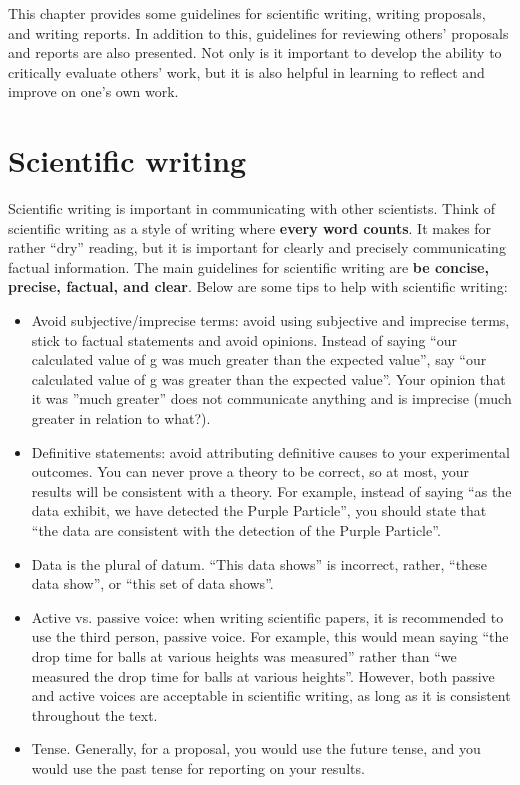 This chapter provides some guidelines for scientific writing, writing proposals, and writing reports. In addition to this, guidelines for reviewing others' proposals and reports are also presented. Not only is it important to develop the ability to critically evaluate others' work, but it is also helpful in learning to reflect and improve on one's own work.

 \vspace{0.25cm}
\section{Scientific writing}
Scientific writing is important in communicating with other scientists. Think of scientific writing as a style of writing where \textbf{every word counts}. It makes for rather ``dry'' reading, but it is important for clearly and precisely communicating factual information. The main guidelines for scientific writing are \textbf{be concise, precise, factual, and clear}. Below are some tips to help with scientific writing:
\begin{itemize}
\item Avoid subjective/imprecise terms: avoid using subjective and imprecise terms, stick to factual statements and avoid opinions.  Instead of saying ``our calculated value of g was much greater than the expected value'', say ``our calculated value of g was greater than the expected value''. Your opinion that it was ''much greater'' does not communicate anything and is imprecise (much greater in relation to what?).
\item Definitive statements: avoid attributing definitive causes to your experimental outcomes. You can never prove a theory to be correct, so at most, your results will be consistent with a theory. For example, instead of saying ``as the data exhibit, we have detected the Purple Particle'', you should state that ``the data are consistent with the detection of the Purple Particle''. 
\item Data is the plural of datum. ``This data shows'' is incorrect, rather, ``these data show'', or ``this set of data shows''.
\item Active vs. passive voice: when writing scientific papers, it is recommended to use the third person, passive voice. For example, this would mean saying ``the drop time for balls at various heights was measured'' rather than ``we measured the drop time for balls at various heights''. However, both passive and active voices are acceptable in scientific writing, as long as it is consistent throughout the text.
\item Tense. Generally, for a proposal, you would use the future tense, and you would use the past tense for reporting on your results.
\end{itemize}
